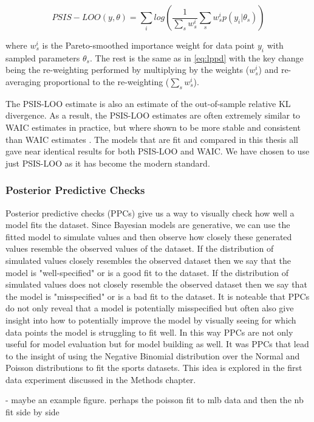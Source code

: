 \begin{equation} \label{eq:psis-loo}
PSIS-LOO(y, \theta) = \sum_i log \left( \frac{1}{\sum_s w_s^i} \sum_s w_s^i p(y_i | \theta_s) \right)
\end{equation}

where $w_s^i$ is the Pareto-smoothed importance weight for data point $y_i$ with sampled parameters $\theta_s$. The rest is the same as in \ref{eq:lppd} with the key change being the re-weighting performed by multiplying by the weights ($w_s^i$) and re-averaging proportional to the re-weighting ($\sum_s w_s^i$).

The PSIS-LOO estimate is also an estimate of the out-of-sample relative KL divergence. As a result, the PSIS-LOO estimates are often extremely similar to WAIC estimates in practice, but where shown to be more stable and consistent than WAIC estimates \cite{Vehtari2016}. The models that are fit and compared in this thesis all gave near identical results for both PSIS-LOO and WAIC. We have chosen to use just PSIS-LOO as it has become the modern standard.

\subsubsection{Posterior Predictive Checks}

Posterior predictive checks (PPCs) give us a way to visually check how well a model fits the dataset. Since Bayesian models are generative, we can use the fitted model to simulate values and then observe how closely these generated values resemble the observed values of the dataset. If the distribution of simulated values closely resembles the observed dataset then we say that the model is "well-specified" or is a good fit to the dataset. If the distribution of simulated values does not closely resemble the observed dataset then we say that the model is "misspecified" or is a bad fit to the dataset. It is noteable that PPCs do not only reveal that a model is potentially misspecified but often also give insight into how to potentially improve the model by visually seeing for which data points the model is struggling to fit well. In this way PPCs are not only useful for model evaluation but for model building as well. It was PPCs that lead to the insight of using the Negative Binomial distribution over the Normal and Poisson distributions to fit the sports datasets. This idea is explored in the first data experiment discussed in the Methods chapter.

- maybe an example figure. perhaps the poisson fit to mlb data and then the nb fit side by side
